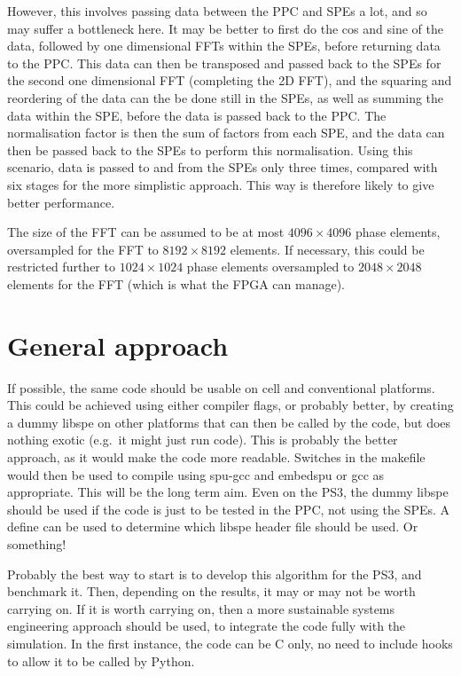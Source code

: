\documentclass{article}
\begin{document}
However, this involves passing data between the PPC and SPEs a lot,
and so may suffer a bottleneck here.  It may be better to first do the
cos and sine of the data, followed by one dimensional FFTs within the
SPEs, before returning data to the PPC.  This data can then be
transposed and passed back to the SPEs for the second one dimensional
FFT (completing the 2D FFT), and the squaring and reordering of the
data can the be done still in the SPEs, as well as summing the data
within the SPE, before the data is passed back to the PPC.  The
normalisation factor is then the sum of factors from each SPE, and the
data can then be passed back to the SPEs to perform this
normalisation.  Using this scenario, data is passed to and from the
SPEs only three times, compared with six stages for the more
simplistic approach.  This way is therefore likely to give better
performance.

The size of the FFT can be assumed to be at most $4096\times4096$
phase elements, oversampled for the FFT to $8192\times8192$ elements.
If necessary, this could be restricted further to $1024\times1024$
phase elements oversampled to $2048\times2048$ elements for the FFT
(which is what the FPGA can manage).


\section{General approach}
If possible, the same code should be usable on cell and conventional
platforms.  This could be achieved using either compiler flags, or
probably better, by creating a dummy libspe on other platforms that
can then be called by the code, but does nothing exotic (e.g.\ it
might just run code).  This is probably the better approach, as it
would make the code more readable.  Switches in the makefile would
then be used to compile using spu-gcc and embedspu or gcc as
appropriate.  This will be the long term aim.  Even on the PS3, the
dummy libspe should be used if the code is just to be tested in the
PPC, not using the SPEs.  A define can be used to determine which
libspe header file should be used.  Or something!

Probably the best way to start is to develop this algorithm for the
PS3, and benchmark it.  Then, depending on the results, it may or may
not be worth carrying on.  If it is worth carrying on, then a more
sustainable systems engineering approach should be used, to integrate
the code fully with the simulation.  In the first instance, the code
can be C only, no need to include hooks to allow it to be called by
Python.
\end{document}

